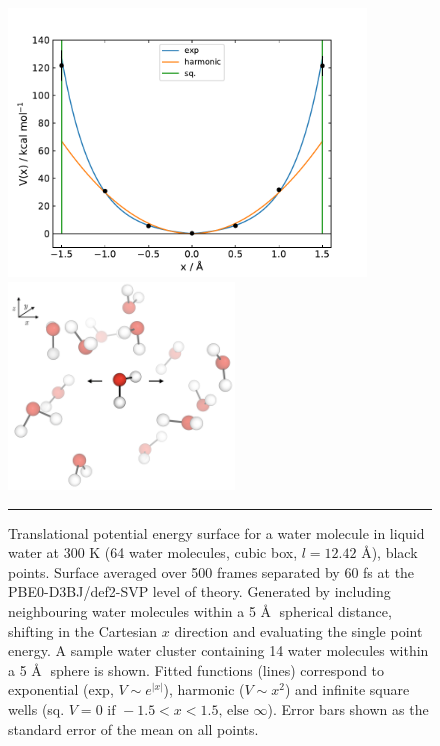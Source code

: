 \documentclass[../main.tex]{subfiles}
\begin{document}
\begin{figure}[h!]
	\centering
	\begin{minipage}[b]{0.6\textwidth}
		\includegraphics[width=9.5cm]{4/figs/figX3/dft_well.pdf}
	\end{minipage}
	\hfill
	\begin{minipage}[b]{0.39\textwidth}
		\includegraphics[width=6cm]{4/figs/figX3/dft_well_trns.png}
		\vspace{0.7cm}
	\end{minipage}
	\vspace{0.2cm}
	\hrule
	\caption{Translational potential energy surface for a water molecule in liquid water at 300 K (64 water molecules, cubic box, $l = 12.42$ \AA), black points. Surface averaged over 500 frames separated by 60 fs at the PBE0-D3BJ/def2-SVP level of theory. Generated by including neighbouring water molecules within a 5 \AA$\;$ spherical distance, shifting in the Cartesian $x$ direction and evaluating the single point energy. A sample water cluster containing 14 water molecules within a 5 \AA$\;$ sphere is shown. Fitted functions (lines) correspond to exponential (exp, $V \sim e^{|x|}$), harmonic ($V \sim x^2$) and infinite square wells (sq. $V = 0 \text{ if }-1.5 < x < 1.5\text{, else } \infty$). Error bars shown as the standard error of the mean on all points.}
	\label{fig::entropy_X3a}
\end{figure}
\end{document}
